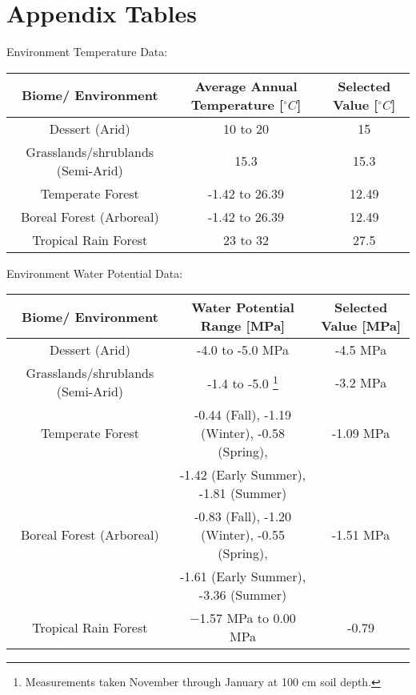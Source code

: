 \documentclass{article}
\begin{document}
\section{Appendix Tables}

Environment Temperature Data:
\begin{table}[H]
\begin{center}
 \begin{tabular}{|c c c|} 
 \hline
 Biome/ Environment & Average Annual Temperature [$^{\circ}C$] & Selected Value [$^{\circ}C$]\\ [0.5ex] 
 \hline\hline
 Dessert (Arid) & 10 to 20 \cite{Davey2007} & 15 \\ 
 \hline
 Grasslands/shrublands (Semi-Arid) & 15.3 \cite{Pelaez1992} & 15.3 \\
 \hline
 Temperate Forest & -1.42 to 26.39 \cite{Zaz2018} & 12.49 \\
 \hline
 Boreal Forest (Arboreal)& -1.42 to 26.39 \cite{Zaz2018} & 12.49 \\
 \hline
 Tropical Rain Forest & 23 to 32 \cite{Paton2020} &27.5 \\
 \hline
\end{tabular}
\end{center}
\end{table}

 

Environment Water Potential Data:
\begin{savenotes}
\begin{table}[H]
\begin{center}
 \begin{tabular}{|c c c|} 
 \hline
 Biome/ Environment & Water Potential Range [MPa] & Selected Value [MPa] \\ [0.5ex] 
 \hline\hline
 Dessert (Arid) & -4.0 to -5.0 MPa \cite{Nilsen1983} & -4.5 MPa \\ 
 \hline
 Grasslands/shrublands (Semi-Arid) & -1.4 to -5.0 \footnote{Measurements taken November through January at 100 cm soil depth.} \cite{Pelaez 1994} & -3.2 MPa\\
 \hline
 Temperate Forest & -0.44 (Fall), -1.19 (Winter), -0.58 (Spring), & -1.09 MPa\\
 &-1.42 (Early Summer), -1.81 (Summer) \cite{Zobel2001}&\\
 \hline
 Boreal Forest (Arboreal) & -0.83 (Fall), -1.20 (Winter), -0.55 (Spring),& -1.51 MPa\\
 &-1.61 (Early Summer), -3.36 (Summer) \cite{Zobel2001} &\\
 \hline
 Tropical Rain Forest & −1.57 MPa to 0.00 MPa  \cite{Kupers2018} & -0.79 \\ 
 \hline
\end{tabular}
\end{center}
\end{table}
\end{savenotes}
\end{document}
